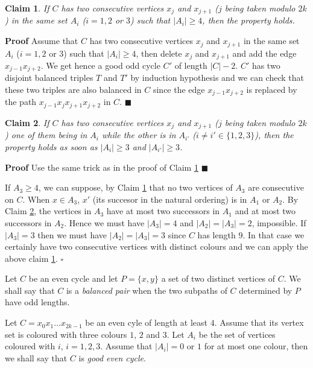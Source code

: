 \documentclass{elsart}
\theoremstyle{plain} \theoremheaderfont{\scshape}
\newtheorem{Clm}{Claim}[Thm]
\newenvironment{Prf}{{\bf \noindent Proof } }{\hfill$\square$\\}
\newenvironment{PrfClaim}{{\bf Proof }}{{\hfill\tiny{$\blacksquare$\\}}}
\begin{document}
\begin{Prf}
\begin{Clm} \label{Claim:Claim1DisjointBalancedTriples}
If $C$ has  two consecutive vertices $x_j$ and $x_{j+1}$ ($j$ being
taken modulo $2k$) in the same set $A_i$ ($i=1,2$ or $3$) such that
$|A_i| \geq 4$, then the property holds.
\end{Clm}
\begin{PrfClaim} Assume that $C$ has two consecutive
vertices $x_j$ and $x_{j+1}$  in the same set $A_i$ ($i=1,2$ or $3$)
such that $|A_i| \geq 4$, then delete $x_j$ and $x_{j+1}$ and add
the edge $x_{j-1}x_{j+2}$. We get hence a good odd cycle $C'$ of
length $|C|-2$. $C'$ has two disjoint balanced triples $T$ and $T'$
by induction hypothesis and we can check that these two triples are
also balanced in $C$ since the edge $x_{j-1}x_{j+2}$ is replaced by
the path $x_{j-1}x_jx_{j+1}x_{j+2}$ in $C$.
\end{PrfClaim}

\begin{Clm} \label{Claim:Claim2DisjointBalancedTriples}
If $C$ has  two consecutive vertices $x_j$ and $x_{j+1}$ ($j$ being
taken modulo $2k$) one of them being in $A_i$ while the other is in
$A_{i'}$ ($i \not = i'  \in \{1,2,3\}$), then the property holds as
soon as $|A_i| \geq 3$ and $|A_{i'}| \geq 3$.
\end{Clm}
\begin{PrfClaim} Use the same trick as in the proof of Claim
\ref{Claim:Claim1DisjointBalancedTriples}
\end{PrfClaim}

If $A_3 \geq 4$, we can suppose, by Claim
\ref{Claim:Claim1DisjointBalancedTriples} that no two vertices of
$A_3$ are consecutive on $C$. When $x \in A_3$, $x'$ (its succesor
in the natural ordering) is in $A_1$ or $A_2$. By Claim
\ref{Claim:Claim2DisjointBalancedTriples}, the vertices in $A_3$
have at most two successors in $A_1$ and at most two successors in
$A_2$. Hence we must have $|A_3| = 4$ and $|A_2|=|A_3|=2$,
impossible. If $|A_3|=3$ then we must have $|A_2|=|A_3|=3$  since
$C$ has length $9$. In that case we certainly have two consecutive
vertices with distinct colours and we can apply the above claim
\ref{Claim:Claim1DisjointBalancedTriples}.
\end{Prf}

Let $C$ be an even cycle and let $P=\{x,y\}$ a set of two distinct
vertices of $C$. We shall say that $C$ is a {\em balanced pair} when
the two subpaths of $C$ determined by $P$ have odd lengths.

Let $C=x_0x_1 \ldots x_{2k-1}$ be an even cyle of length at least
$4$. Assume that its vertex set is coloured with three colours $1$,
$2$ and $3$. Let $A_i$  be  the set of vertices coloured with $i$,
$i =1,2,3$. Assume that  $|A_i|=0$ or $1$ for at most one colour,
then we shall say that $C$ is {\em good even cycle}.
\end{document}
